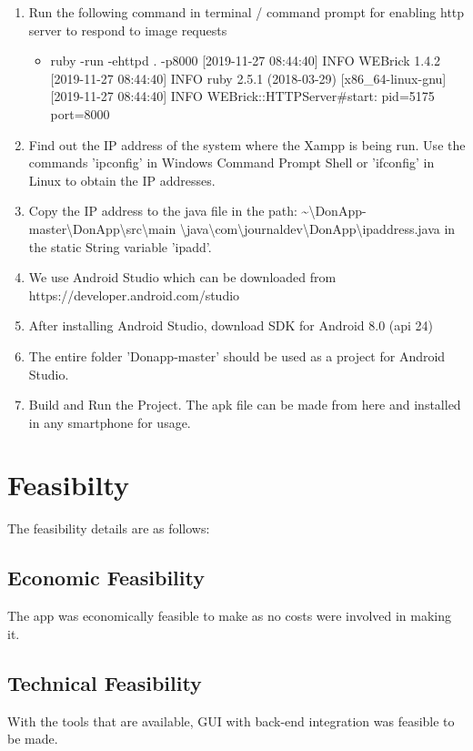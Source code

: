 \documentclass[12pt, a4paper]{article}
\begin{document}
\begin{enumerate}
\begin{itemize}
    \end{itemize}
    \item Run the following command in terminal / command prompt for enabling http server to respond to image requests
    \begin{itemize}
        \item ruby -run -ehttpd . -p8000
        [2019-11-27 08:44:40] INFO  WEBrick 1.4.2 
        [2019-11-27 08:44:40] INFO  ruby 2.5.1 (2018-03-29) [x86\_64-linux-gnu]
        [2019-11-27 08:44:40] INFO  WEBrick::HTTPServer\#start: pid=5175 port=8000
    \end{itemize}
    \item Find out the IP address of the system where the Xampp is being run. Use the commands 'ipconfig' in Windows Command Prompt Shell or 'ifconfig' in Linux to obtain the IP addresses.
    \item Copy the IP address to the java file in the path: \textasciitilde \textbackslash DonApp-master\textbackslash DonApp\textbackslash src\textbackslash main \textbackslash java\textbackslash com\textbackslash journaldev\textbackslash DonApp\textbackslash ipaddress.java in the static String variable 'ipadd'.
    \item We use Android Studio which can be downloaded from https://developer.android.com/studio
    \item After installing Android Studio, download SDK for Android 8.0 (api 24)
    \item The entire folder 'Donapp-master' should be used as a project for Android Studio.
    \item Build and Run the Project. The apk file can be made from here and installed in any smartphone for usage.
\end{enumerate}
\section{\textbf{Feasibilty}}
The feasibility details are as follows:
\subsection{Economic Feasibility}
The app was economically feasible to make as no costs were involved in making it.
\subsection{Technical Feasibility}
With the tools that are available, GUI with back-end integration was feasible to be made.
\end{document}
